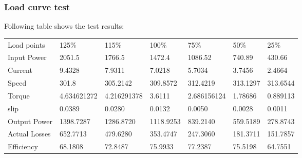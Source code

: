 \subsubsection{Load curve test}
Following table shows the test results:
\begin{table}[hbtp!]
\begin{tabular}{
    >{\columncolor[HTML]{9B9B9B}}l llllll}
    \cellcolor[HTML]{656565}Load points & \cellcolor[HTML]{656565}125\% & \cellcolor[HTML]{656565}115\% & \cellcolor[HTML]{656565}100\% & \cellcolor[HTML]{656565}75\% & \cellcolor[HTML]{656565}50\% & \cellcolor[HTML]{656565}25\% \\
    Input Power                         & 2051.5                        & 1766.5                        & 1472.4                        & 1086.52                      & 740.89                       & 430.66                       \\
    Current                             & 9.4328                        & 7.9311                        & 7.0218                        & 5.7034                       & 3.7456                       & 2.4664                       \\
    Speed                               & 301.8                         & 305.2142                      & 309.8572                      & 312.4219                     & 313.1297                     & 313.6544                     \\
    Torque                              & 4.634621272                   & 4.216291378                   & 3.6111                        & 2.686156124                  & 1.78686                      & 0.889113                     \\
    slip                                & 0.0389                        & 0.0280                        & 0.0132                        & 0.0050                       & 0.0028                       & 0.0011                       \\
    Output Power                        & 1398.7287                     & 1286.8720                     & 1118.9253                     & 839.2140                     & 559.5189                     & 278.8743                     \\
    Actual Losses                       & 652.7713                      & 479.6280                      & 353.4747                      & 247.3060                     & 181.3711                     & 151.7857                     \\
    Efficiency                          & 68.1808                       & 72.8487                       & 75.9933                       & 77.2387                      & 75.5198                      & 64.7551                      \\

\end{tabular}
\end{table}
